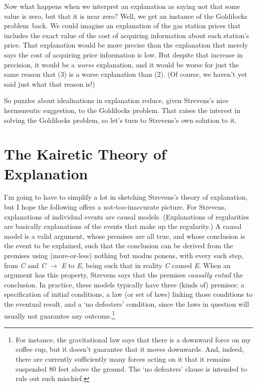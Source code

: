 \documentclass[
  11pt,
  letterpaper,
  DIV=11,
  numbers=noendperiod,
  twoside]{scrartcl}
\begin{document}
Now what happens when we interpret an explanation as saying not that
some value is zero, but that it is near zero? Well, we get an instance
of the Goldilocks problem~back. We could imagine an explanation of the
gas station prices that includes the exact value of the cost of
acquiring information about each station's price. That explanation would
be more precise than the explanation that merely says the cost of
acquiring price information is low. But despite that increase in
precision, it would be a \emph{worse} explanation, and it would be worse
for just the same reason that (3) is a worse explanation than (2). (Of
course, we haven't yet said just what that reason is!)

So puzzles about idealisations in explanation reduce, given Strevens's
nice hermeneutic suggestion, to the Goldilocks problem. That raises the
interest in solving the Goldilocks problem, so let's turn to Strevens's
own solution to it.

\section{The Kairetic Theory of
Explanation}\label{the-kairetic-theory-of-explanation}

I'm going to have to simplify a lot in sketching Strevens's theory of
explanation, but I hope the following offers a not-too-inaccurate
picture. For Strevens, explanations of individual events are causal
models. (Explanations of regularities are basically explanations of the
events that make up the regularity.) A causal model is a valid argument,
whose premises are all true, and whose conclusion is the event to be
explained, such that the conclusion can be derived from the premises
using (more-or-less) nothing but modus ponens, with every such step,
from \emph{C} and \emph{C} \(\rightarrow\) \emph{E} to \emph{E}, being
such that in reality \emph{C} caused \emph{E}. When an argument has this
property, Strevens says that the premises \emph{causally entail} the
conclusion. In practice, these models typically have three (kinds of)
premises: a specification of initial conditions, a law (or set of laws)
linking those conditions to the eventual result, and a `no defeaters'
condition, since the laws in question will usually not guarantee any
outcome.\footnote{For instance, the gravitational law says that there is
  a downward force on my coffee cup, but it doesn't guarantee that it
  moves downwards. And, indeed, there are currently sufficiently many
  forces acting on it that it remains suspended 80 feet above the
  ground. The `no defeaters' clause is intended to rule out such
  mischief.}
\end{document}
